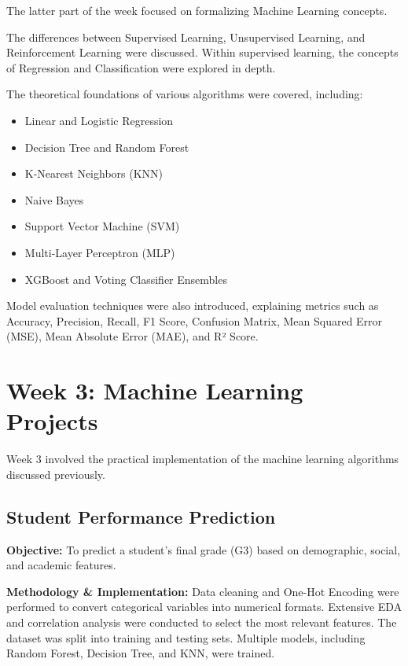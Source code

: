 The latter part of the week focused on formalizing Machine Learning concepts. 

The differences between Supervised Learning, Unsupervised Learning, and Reinforcement Learning were discussed. Within supervised learning, the concepts of Regression and Classification were explored in depth. 

The theoretical foundations of various algorithms were covered, including:
\begin{itemize}[leftmargin=1.5cm]
    \item Linear and Logistic Regression
    \item Decision Tree and Random Forest
    \item K-Nearest Neighbors (KNN)
    \item Naive Bayes
    \item Support Vector Machine (SVM)
    \item Multi-Layer Perceptron (MLP)
    \item XGBoost and Voting Classifier Ensembles
\end{itemize}

Model evaluation techniques were also introduced, explaining metrics such as Accuracy, Precision, Recall, F1 Score, Confusion Matrix, Mean Squared Error (MSE), Mean Absolute Error (MAE), and R² Score.

\section{Week 3: Machine Learning Projects}

Week 3 involved the practical implementation of the machine learning algorithms discussed previously.

\subsection{Student Performance Prediction}

\textbf{Objective:} To predict a student's final grade (G3) based on demographic, social, and academic features.

\textbf{Methodology \& Implementation:} 
Data cleaning and One-Hot Encoding were performed to convert categorical variables into numerical formats. Extensive EDA and correlation analysis were conducted to select the most relevant features. The dataset was split into training and testing sets. Multiple models, including Random Forest, Decision Tree, and KNN, were trained. 

